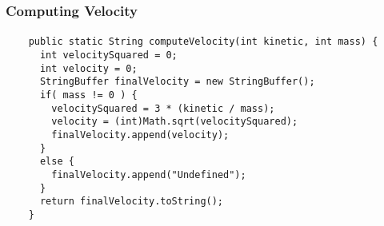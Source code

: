 
\begin{frame}[fragile]
  \frametitle{\vspace*{.3in}Computing Velocity}
  \framesubtitle{}

  \normalsize
  \hspace*{-.65in}
  \begin{minipage}{5in}
  \begin{verbatim}
    public static String computeVelocity(int kinetic, int mass) {
      int velocitySquared = 0;
      int velocity = 0;
      StringBuffer finalVelocity = new StringBuffer();
      if( mass != 0 ) {
        velocitySquared = 3 * (kinetic / mass);
        velocity = (int)Math.sqrt(velocitySquared);
        finalVelocity.append(velocity);
      }
      else {
        finalVelocity.append("Undefined");
      }
      return finalVelocity.toString();
    }
  \end{verbatim}
\end{minipage}
  \normalsize
\end{frame}
